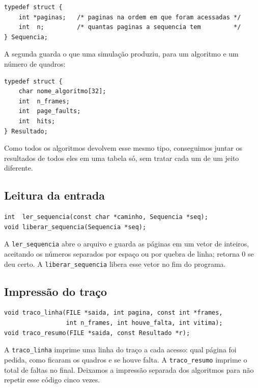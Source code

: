 \documentclass[12pt]{article}
\begin{document}
{\scriptsize
\begin{verbatim}
typedef struct {
    int *paginas;   /* paginas na ordem em que foram acessadas */
    int  n;         /* quantas paginas a sequencia tem         */
} Sequencia;
\end{verbatim}
}

A segunda guarda o que uma simulação produziu, para um algoritmo e um número de
quadros:

{\scriptsize
\begin{verbatim}
typedef struct {
    char nome_algoritmo[32];
    int  n_frames;
    int  page_faults;
    int  hits;
} Resultado;
\end{verbatim}
}

Como todos os algoritmos devolvem esse mesmo tipo, conseguimos juntar os
resultados de todos eles em uma tabela só, sem tratar cada um de um jeito
diferente.

\subsection{Leitura da entrada}
\label{sec:leitura}

{\scriptsize
\begin{verbatim}
int  ler_sequencia(const char *caminho, Sequencia *seq);
void liberar_sequencia(Sequencia *seq);
\end{verbatim}
}

A \texttt{ler\_sequencia} abre o arquivo e guarda as páginas em um vetor de
inteiros, aceitando os números separados por espaço ou por quebra de linha;
retorna 0 se deu certo. A \texttt{liberar\_sequencia} libera esse vetor no fim
do programa.

\subsection{Impressão do traço}
\label{sec:traco}

{\scriptsize
\begin{verbatim}
void traco_linha(FILE *saida, int pagina, const int *frames,
                 int n_frames, int houve_falta, int vitima);
void traco_resumo(FILE *saida, const Resultado *r);
\end{verbatim}
}

A \texttt{traco\_linha} imprime uma linha do traço a cada acesso: qual página foi
pedida, como ficaram os quadros e se houve falta. A \texttt{traco\_resumo}
imprime o total de faltas no final. Deixamos a impressão separada dos algoritmos
para não repetir esse código cinco vezes.
\end{document}
